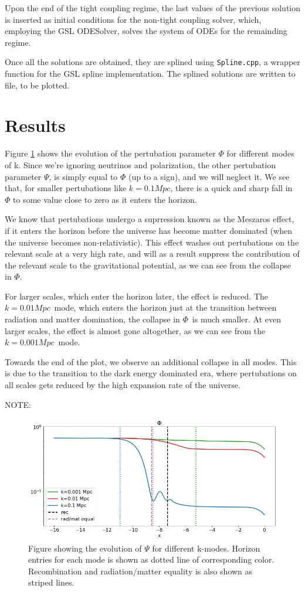 \documentclass[10pt, a4paper]{article}
\begin{document}
Upon the end of the tight coupling regime, the last values of the previous solution is inserted as initial conditions for the non-tight coupling solver, which, employing the GSL ODESolver, solves the system of ODEs for the remainding regime.

Once all the solutions are obtained, they are splined using \texttt{Spline.cpp}, a wrapper function for the GSL spline implementation. The splined solutions are written to file, to be plotted.



\section{Results}
Figure \ref{fig:Phi} shows the evolution of the pertubation parameter $\Phi$ for different modes of k. Since we're ignoring neutrinos and polarization, the other pertubation parameter $\Psi$, is simply equal to $\Phi$ (up to a sign), and we will neglect it. We see that, for smaller pertubations like $k=0.1Mpc$, there is a quick and sharp fall in $\Phi$ to some value close to zero as it enters the horizon.

We know that pertubations undergo a suprression known as the Meszaros effect, if it enters the horizon before the universe has become matter dominated (when the universe becomes non-relativistic). This effect washes out pertubations on the relevant scale at a very high rate, and will as a result suppress the contribution of the relevant scale to the gravitational potential, as we can see from the collapse in $\Phi$.

For larger scales, which enter the horizon later, the effect is reduced. The $k=0.01Mpc$ mode, which enters the horizon just at the transition between radiation and matter domination, the collapse in $\Phi$ is much smaller. At even larger scales, the effect is almost gone altogether, as we can see from the $k=0.001Mpc$ mode.

Towards the end of the plot, we observe an additional collapse in all modes. This is due to the transition to the dark energy dominated era, where pertubations on all scales gets reduced by the high expansion rate of the universe.

NOTE: 
\begin{figure}[H]
    \centering
    \includegraphics[scale=0.45]{../m3_figs/Phi.png}
    \caption{Figure showing the evolution of $\Psi$ for different k-modes. Horizon entries for each mode is shown as dotted line of corresponding color. Recombination and radiation/matter equality is also shown as striped lines.}
    \label{fig:Phi}
\end{figure}
\end{document}
